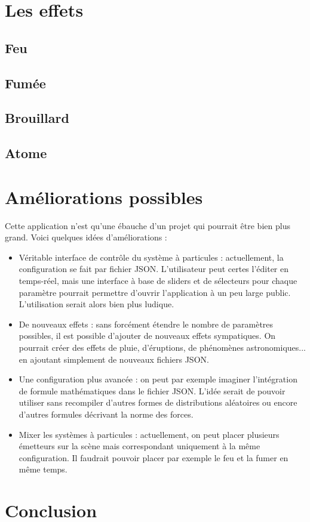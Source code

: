 \documentclass[a4paper,10pt]{article}
\begin{document}
\section{Les effets}
\subsection{Feu}
\subsection{Fumée}
\subsection{Brouillard}
\subsection{Atome}

\section{Améliorations possibles}
Cette application n'est qu'une ébauche d'un projet qui pourrait être bien plus grand.
Voici quelques idées d'améliorations :
\begin{itemize}
 \item Véritable interface de contrôle du système à particules : actuellement, la configuration se fait par fichier JSON.
 L'utilisateur peut certes l'éditer en temps-réel, mais une interface à base de sliders et de sélecteurs pour chaque paramètre pourrait permettre d'ouvrir l'application à un peu large public.
 L'utilisation serait alors bien plus ludique.
 \item De nouveaux effets : sans forcément étendre le nombre de paramètres possibles, il est possible d'ajouter de nouveaux effets sympatiques.
 On pourrait créer des effets de pluie, d'éruptions, de phénomènes astronomiques... en ajoutant simplement de nouveaux fichiers JSON.
 \item Une configuration plus avancée : on peut par exemple imaginer l'intégration de formule mathématiques dans le fichier JSON.
 L'idée serait de pouvoir utiliser sans recompiler d'autres formes de distributions aléatoires ou encore d'autres formules décrivant la norme des forces.
 \item Mixer les systèmes à particules : actuellement, on peut placer plusieurs émetteurs sur la scène mais correspondant uniquement à la même configuration.
 Il faudrait pouvoir placer par exemple le feu et la fumer en même temps.
\end{itemize}


\section{Conclusion}
\end{document}
